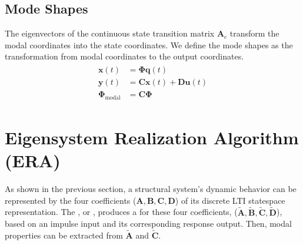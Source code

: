 \documentclass[letterpaper,10pt,english]{sphinxmanual}
\begin{document}
\subsection{Mode Shapes}
\label{\detokenize{theory/modes:mode-shapes}}
\sphinxAtStartPar
The eigenvectors of the continuous state transition matrix
\(\mathbf{A}_{c}\) transform the modal coordinates into the state
coordinates. We define the mode shapes as the transformation from modal
coordinates to the output coordinates.
\begin{equation*}
\begin{split}\begin{aligned}
\mathbf{x}(t) &= \mathbf{\Phi q}(t) \\
\mathbf{y}(t) &= \mathbf{Cx}(t) + \mathbf{Du}(t) \\
\mathbf{\Phi}_{\text{modal}} &= \mathbf{C\Phi}
\end{aligned}\end{split}
\end{equation*}
\sphinxstepscope


\section{Eigensystem Realization Algorithm (ERA)}
\label{\detokenize{theory/era:eigensystem-realization-algorithm-era}}\label{\detokenize{theory/era::doc}}
\sphinxAtStartPar
As shown in the previous section, a structural system’s dynamic behavior
can be represented by the four coefficients
(\(\mathbf{A},\mathbf{B},\mathbf{C},\mathbf{D}\)) of its discrete
LTI state\sphinxhyphen{}space representation. The , or
,
produces a  for these four coefficients,
(\(\mathbf{\tilde{A}},\mathbf{\tilde{B}},\mathbf{\tilde{C}},\mathbf{\tilde{D}}\)),
based on an impulse input and its corresponding response output. Then,
modal properties can be extracted from \(\mathbf{\tilde{A}}\) and
\(\mathbf{\tilde{C}}\).
\end{document}

